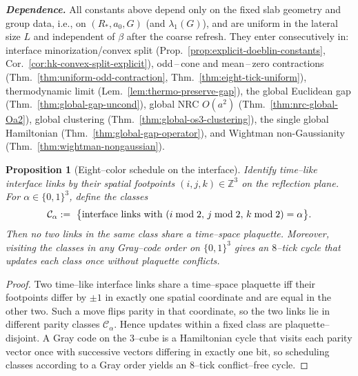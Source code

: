 \documentclass[11pt]{amsart}
\theoremstyle{plain}
\newtheorem{proposition}[theorem]{Proposition}
\theoremstyle{definition}
\theoremstyle{remark}
\begin{document}
\begin{mdframed}[linewidth=0.5pt, linecolor=gray!40, backgroundcolor=gray!5, roundcorner=2pt, innertopmargin=8pt, innerbottommargin=8pt, skipabove=8pt]
\noindent\textit{\textbf{Dependence.}} All constants above depend only on the fixed slab geometry and group data, i.e., on $(R_*,a_0,G)$ (and $\lambda_1(G)$), and are uniform in the lateral size $L$ and independent of $\beta$ after the coarse refresh. They enter consecutively in: interface minorization/convex split (Prop.~\ref{prop:explicit-doeblin-constants}, Cor.~\ref{cor:hk-convex-split-explicit}), odd\,–\,cone and mean\,–\,zero contractions (Thm.~\ref{thm:uniform-odd-contraction}, Thm.~\ref{thm:eight-tick-uniform}), thermodynamic limit (Lem.~\ref{lem:thermo-preserve-gap}), the global Euclidean gap (Thm.~\ref{thm:global-gap-uncond}), global NRC $O(a^2)$ (Thm.~\ref{thm:nrc-global-Oa2}), global clustering (Thm.~\ref{thm:global-os3-clustering}), the single global Hamiltonian (Thm.~\ref{thm:global-gap-operator}), and Wightman non-Gaussianity (Thm.~\ref{thm:wightman-nongaussian}).
\end{mdframed}

\begin{proposition}[Eight--color schedule on the interface]\label{prop:eight-color-schedule}
Identify time--like interface links by their spatial footpoints $(i,j,k)\in\mathbb Z^3$ on the reflection plane. For $\alpha\in\{0,1\}^3$, define the classes
\[
  \mathcal C_{\alpha}
   \\ :=\ \big\{\text{interface links with }(i\bmod 2,\,j\bmod 2,\,k\bmod 2)=\alpha\big\}.
\]
Then no two links in the same class share a time--space plaquette. Moreover, visiting the classes in any Gray--code order on $\{0,1\}^3$ gives an $8$--tick cycle that updates each class once without plaquette conflicts.
\end{proposition}
\begin{proof}
Two time--like interface links share a time--space plaquette iff their footpoints differ by $\pm1$ in exactly one spatial coordinate and are equal in the other two. Such a move flips parity in that coordinate, so the two links lie in different parity classes $\mathcal C_{\alpha}$. Hence updates within a fixed class are plaquette--disjoint. A Gray code on the $3$--cube is a Hamiltonian cycle that visits each parity vector once with successive vectors differing in exactly one bit, so scheduling classes according to a Gray order yields an $8$--tick conflict--free cycle.
\end{proof}
\end{document}
